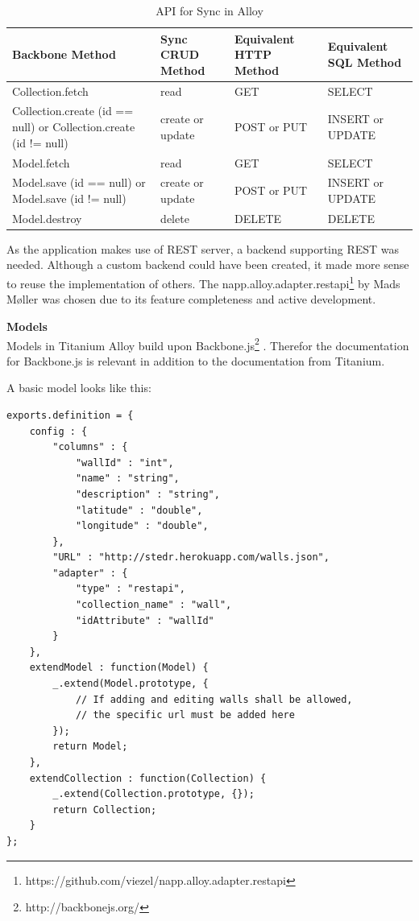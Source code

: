 \documentclass[11pt]{book}
\begin{document}
\begin{table}[H]
	\centering
	\begin{tabular}{| p{3.5cm} | p{3.5cm} | p{3.5cm} | p{2.5cm} |}
		\hline
		Backbone Method & Sync CRUD Method & Equivalent HTTP Method & Equivalent SQL Method\\
		\hline
		Collection.fetch & read & GET & SELECT\\
		\hline
		Collection.create (id == null) or Collection.create (id != null) & create or update & POST or PUT & INSERT or UPDATE\\
		\hline
		Model.fetch & read	& GET & SELECT\\
		\hline
		Model.save (id == null) or Model.save (id != null) & create or update & POST or PUT & INSERT or UPDATE\\
		\hline
		Model.destroy & delete & DELETE & DELETE\\
		\hline
	\end{tabular}
	\label{tab:phase_sprint2_model}
	\caption{API for Sync in Alloy\cite{titaniumAlloySync}}
\end{table}

As the application makes use of REST server, a backend supporting REST was needed. Although a custom backend could have been created, it made more sense to reuse the implementation of others. The napp.alloy.adapter.restapi\footnote{https://github.com/viezel/napp.alloy.adapter.restapi} by Mads Møller was chosen due to its feature completeness and active development.

\textbf{Models}\\
Models in Titanium Alloy build upon Backbone.js\footnote{http://backbonejs.org/} \cite{titaniumAlloyModel}. Therefor the documentation for Backbone.js is relevant in addition to the documentation from Titanium.

A basic model looks like this:
\begin{lstlisting}[frame=single]
exports.definition = {
    config : {
        "columns" : {
            "wallId" : "int",
            "name" : "string",
            "description" : "string",
            "latitude" : "double",
            "longitude" : "double",
        },
        "URL" : "http://stedr.herokuapp.com/walls.json",
        "adapter" : {
            "type" : "restapi",
            "collection_name" : "wall",
            "idAttribute" : "wallId"
        }
    },
    extendModel : function(Model) {
        _.extend(Model.prototype, {
            // If adding and editing walls shall be allowed,
            // the specific url must be added here
        });
        return Model;
    },
    extendCollection : function(Collection) {
        _.extend(Collection.prototype, {});
        return Collection;
    }
};
\end{lstlisting}
\end{document}
